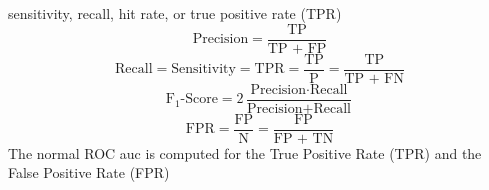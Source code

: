 \documentclass[letterpaper,10pt,english]{jupyterBook}
\begin{document}
\sphinxAtStartPar
sensitivity, recall, hit rate, or true positive rate (TPR)
\label{equation:imbalanced_data:26634868-1db1-4f99-a3cf-b6a359b75b00}\begin{equation}
 \text{Precision}=\frac{\text{TP}}{\text{TP + FP}}
   \end{equation}\label{equation:imbalanced_data:ff0cda55-bfbb-4a85-bd64-2e68f9907604}\begin{equation} 
 \text{Recall}=\text{Sensitivity}=\text{TPR}=\frac{\text{TP}}{\text{P}} =\frac{\text{TP}}{\text{TP + FN}}
    \end{equation}\label{equation:imbalanced_data:d1b6ec80-1d0c-44c9-82c7-56714e45d90c}\begin{equation} 
 \text{F}_1\text{-Score} = 2\frac{\text{Precision} \cdot \text{Recall}}{\text{Precision} + \text{Recall}}
     \end{equation}\label{equation:imbalanced_data:a75d568b-8fe7-4add-ad43-58cf0c2dd416}\begin{equation}   
  \text{FPR}=\frac{\text{FP}}{\text{N}} =\frac{\text{FP}}{\text{FP + TN}}
    \end{equation}
\sphinxAtStartPar
The normal ROC auc is computed for the True Positive Rate (TPR) and the False Positive Rate (FPR)

\begin{sphinxVerbatim}[commandchars=\\\{\}]
  
  
\end{sphinxVerbatim}
\end{document}
